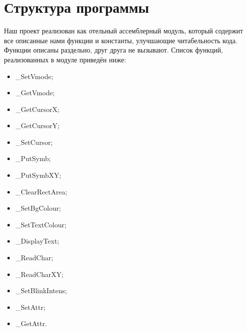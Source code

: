 \documentclass[a4paper,12pt,notitlepage,pdftex,headsepline]{scrartcl}
\begin{document}
\section{Структура программы}
Наш проект реализован как отельный ассемблерный модуль, который содержит все описанные нами функции и константы, улучшающие читабельность кода.
Функции описаны раздельно, друг друга не вызывают.
Список функций, реализованных в модуле приведён ниже:
\begin{itemize}
\tt
\item \_SetVmode;
\item \_GetVmode;
\item \_GetCursorX;
\item \_GetCursorY;
\item \_SetCursor;
\item \_PutSymb;
\item \_PutSymbXY;
\item \_ClearRectArea;
\item \_SetBgColour;
\item \_SetTextColour;
\item \_DisplayText;
\item \_ReadChar;
\item \_ReadCharXY;
\item \_SetBlinkIntens;
\item \_SetAttr;
\item \_GetAttr.
\end{itemize}
\newpage
\end{document}
